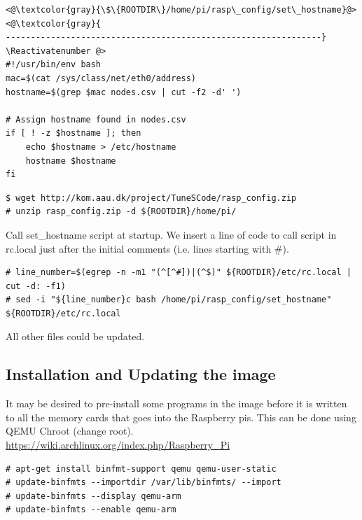 \Suppressnumber\begin{lstlisting}[]
<@\textcolor{gray}{\$\{ROOTDIR\}/home/pi/rasp\_config/set\_hostname}@>
<@\textcolor{gray}{
---------------------------------------------------------------}
\Reactivatenumber @>
#!/usr/bin/env bash
mac=$(cat /sys/class/net/eth0/address)
hostname=$(grep $mac nodes.csv | cut -f2 -d' ')

# Assign hostname found in nodes.csv
if [ ! -z $hostname ]; then
    echo $hostname > /etc/hostname
    hostname $hostname
fi
\end{lstlisting}
\FloatBarrier



\begin{lstlisting}[]
$ wget http://kom.aau.dk/project/TuneSCode/rasp_config.zip
# unzip rasp_config.zip -d ${ROOTDIR}/home/pi/
\end{lstlisting}
\FloatBarrier


Call set\_hostname script at startup. We insert a line of code to call script in rc.local just after the initial comments (i.e. lines starting with \#).
\begin{lstlisting}[]
# line_number=$(egrep -n -m1 "(^[^#])|(^$)" ${ROOTDIR}/etc/rc.local | cut -d: -f1)
# sed -i "${line_number}c bash /home/pi/rasp_config/set_hostname" ${ROOTDIR}/etc/rc.local
\end{lstlisting}
\FloatBarrier


All other files could be updated.

\subsection{Installation and Updating the image}

It may be desired to pre-install some programs in the image before it is
written to all the memory cards that goes into the Raspberry pis.
This can be done using QEMU Chroot (change root).
\url{https://wiki.archlinux.org/index.php/Raspberry_Pi}



\begin{lstlisting}[]
# apt-get install binfmt-support qemu qemu-user-static
# update-binfmts --importdir /var/lib/binfmts/ --import
# update-binfmts --display qemu-arm
# update-binfmts --enable qemu-arm
\end{lstlisting}
\FloatBarrier

